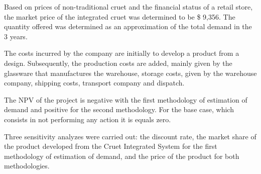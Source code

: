 Based on prices of non-traditional cruet and the financial status of a retail store, the market price of the integrated cruet was determined to be \$ 9,356. The quantity offered was determined as an approximation of the total demand in the 3 years.

The costs incurred by the company are initially to develop a product from a design. Subsequently, the production costs are added, mainly given by the glassware that manufactures the warehouse, storage costs, given by the warehouse company, shipping costs, transport company and dispatch.

The NPV of the project is negative with the first methodology of estimation of demand and positive for the second methodology. For the base case, which consists in not performing any action it is equals zero.

Three sensitivity analyzes were carried out: the discount rate, the market share of the product developed from the Cruet Integrated System for the first methodology of estimation of demand, and the price of the product for both methodologies.

